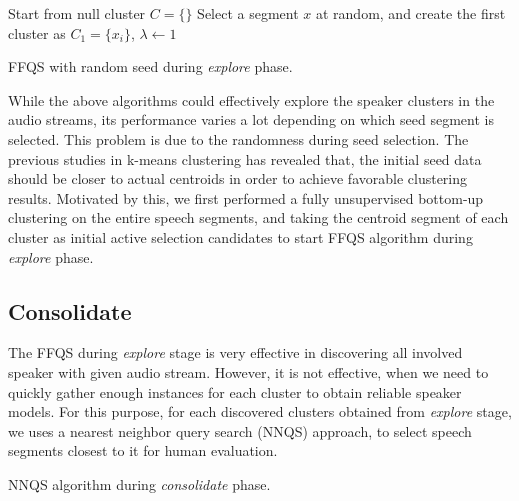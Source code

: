 \documentclass[journal]{IEEEtran}
\begin{document}
\begin{algorithm}
	Start from null cluster $C= \{\}$\;
	Select a segment $x$ at random, and create the first cluster as $C_1 = \{x_i\}$, $\lambda \leftarrow 1$\; 
	\caption{FFQS with random seed during \textit{explore} phase.}
\end{algorithm}
 
While the above algorithms could effectively explore the speaker clusters in the audio streams, its performance varies a lot depending on which seed segment is selected. This problem is due to the randomness during seed selection. The previous studies in k-means clustering has revealed that, the initial seed data should be closer to actual centroids in order to achieve favorable clustering results. Motivated by this, we first performed a fully unsupervised bottom-up clustering on the entire speech segments, and taking the centroid segment of each cluster as initial active selection candidates to start FFQS algorithm during \textit{explore} phase.

\subsection{Consolidate}
The FFQS during \textit{explore} stage is very effective in discovering all involved speaker with given audio stream. However, it is not effective, when we need to quickly gather enough instances for each cluster to obtain reliable speaker models. For this purpose, for each discovered clusters obtained from \textit{explore} stage, we uses a nearest neighbor query search (NNQS) approach, to select speech segments closest to it for human evaluation.  

\begin{algorithm}[b]
	\caption{NNQS algorithm during \textit{consolidate} phase.}
\end{algorithm}
\end{document}
